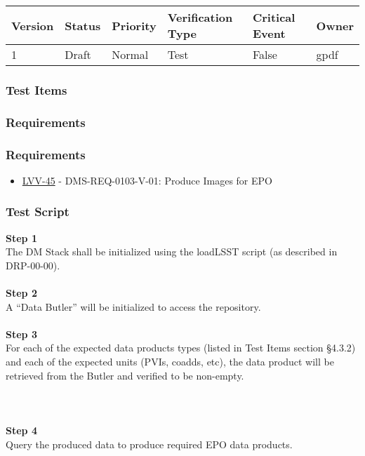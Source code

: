 \begin{longtable}[]{@{}llllll@{}}
\toprule
Version & Status & Priority & Verification Type & Critical Event &
Owner\tabularnewline
\midrule
\endhead
1 & Draft & Normal & Test & False & gpdf\tabularnewline
\bottomrule
\end{longtable}

\hypertarget{test-items-27}{%
\subsubsection{Test Items}\label{test-items-27}}

\hypertarget{requirements-54}{%
\subsubsection{Requirements}\label{requirements-54}}

\hypertarget{requirements-55}{%
\subsubsection{Requirements}\label{requirements-55}}

\begin{itemize}
\tightlist
\item
  \href{https://jira.lsstcorp.org/browse/LVV-45}{LVV-45} -
  DMS-REQ-0103-V-01: Produce Images for EPO
\end{itemize}

\hypertarget{test-script-27}{%
\subsubsection{Test Script}\label{test-script-27}}

\textbf{Step 1}\\
The DM Stack shall be initialized using the loadLSST script (as
described in DRP-00-00).\\
~\\
\textbf{Step 2}\\
A ``Data Butler'' will be initialized to access the repository.\\
~\\
\textbf{Step 3}\\
For each of the expected data products types (listed in Test Items
section §4.3.2) and each of the expected units (PVIs, coadds, etc), the
data product will be retrieved from the Butler and verified to be
non-empty.\\
~\\
~\\
~\\
\textbf{Step 4}\\
Query the produced data to produce required EPO data products.\\
~\\

